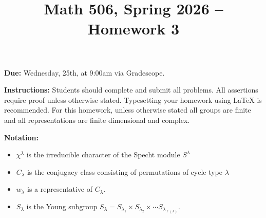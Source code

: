 \documentclass[12pt]{article}
\title{Math 506, Spring 2026 -- Homework 3}
\date{}
\begin{document}
 \maketitle
\vspace{-80pt}

\textbf{Due:} Wednesday, 25th, at 9:00am via Gradescope.

\textbf{Instructions:} Students should complete and submit all problems. All assertions require proof unless otherwise stated. Typesetting your homework using LaTeX is recommended. For this homework, unless otherwise stated all groups are finite and all representations are finite dimensional and complex.

\textbf{Notation:}
\begin{itemize}
    \item $\chi^\lambda$ is the irreducible character of the Specht module $S^\lambda$
    \item $C_\lambda$ is the conjugacy class consisting of permutations of cycle type $\lambda$
    \item $w_\lambda$ is a representative of $C_\lambda$.
    \item $S_\lambda$ is the Young subgroup $S_\lambda = S_{\lambda_1}\times S_{\lambda_2}\times\cdots S_{\lambda_{\ell(\lambda)}}$.
\end{itemize}
\end{document}
